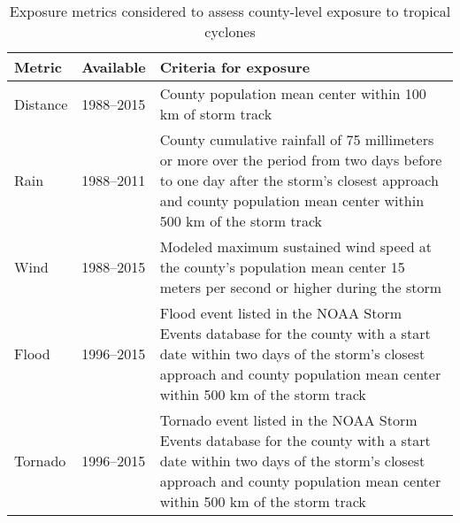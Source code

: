\begin{table}%
\centering 
\caption{Exposure metrics considered to assess county-level exposure to 
tropical cyclones}
\begin{tabular}{p{1.5cm}p{2.5cm}p{10cm}} 
\toprule
Metric & Available & Criteria for exposure \\ \midrule 
Distance & 1988--2015 & County population mean center within 100 \si{\kilo\metre} of storm track \\ 
Rain & 1988--2011 & County cumulative rainfall of 75 millimeters or more over the period from two days before to one day after the storm's closest approach and county population mean center within 500 \si{\kilo\metre} of the storm track \\ 
Wind & 1988--2015 & Modeled maximum sustained wind speed at the county's population mean center 15 meters per second or higher during the storm\\ 
Flood & 1996--2015 & Flood event listed in the \ac{NOAA} Storm Events database for the county with a start date within two days of the storm's closest approach and county population mean center within 500 \si{\kilo\metre} of the storm track \\
Tornado & 1996--2015 & Tornado event listed in the \ac{NOAA} Storm Events database for the county with a start date within two days of the storm's closest approach and county population mean center within 500 \si{\kilo\metre} of the storm track\\
\bottomrule 
\end{tabular} 
\label{tab:exposuremetrics} 
\end{table}

\clearpage


